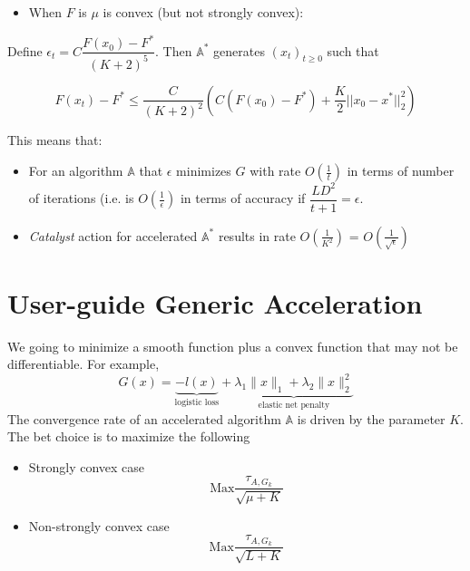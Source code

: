 \documentclass[10pt]{article}
\newcommand\bi{\begin{itemize}}
\newcommand\ei{\end{itemize}}
\begin{document}
\bi
\item When $F$ is $\mu$ is convex (but not strongly convex):
\ei

Define $\epsilon_t = C \dfrac{F(x_0) - F^*}{(K+2)^5}$. Then $\mathbb{A}^*$ generates $(x_t)_{t\geq0}$ such that

\[
F(x_t) - F^* \leq \dfrac{C}{(K+2)^2} \left( C(F(x_0) - F^*) + \dfrac{K}{2} ||x_0 - x^*||_2^2 \right)
\]

\noindent This means that:

\bi
\item For an algorithm $\mathbb{A}$ that $\epsilon$ minimizes $G$ with rate $O(\frac{1}{t})$ in terms of number of iterations (i.e. is $O(\frac{1}{\epsilon})$ in terms of accuracy if $\dfrac{LD^2}{t+1} = \epsilon$.
\item \textit{Catalyst} action for accelerated $\mathbb{A}^*$ results in rate $O(\frac{1}{K^2})$ = $O(\frac{1}{\sqrt{\epsilon}})$
\ei


\section{User-guide Generic Acceleration}
We going to minimize a smooth function plus a convex function that may not be differentiable. For example, 
\[
G(x) = \underbrace{-l(x)}_{\text{logistic loss}} + \underbrace{\lambda_1 \|x\|_1 + \lambda_2 \|x\|_2^2}_{\text{elastic net penalty}}
\]
The convergence rate of an accelerated algorithm $\mathbb{A}$ is driven by the parameter $K$. The bet choice is to maximize the following
\bi
\item Strongly convex case 
\[
\text{Max} \frac{\tau_{A, G_k}}{\sqrt{\mu+K}}
\]

\item Non-strongly convex case
\[
\text{Max} \frac{\tau_{A, G_k}}{\sqrt{L+K}}
\]
\ei




\end{document}
